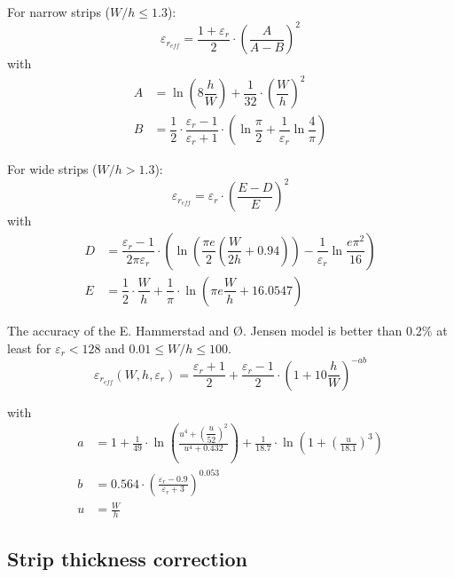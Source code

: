 \documentclass[10pt]{report}
\begin{document}
For narrow strips ($W/h \le 1.3$):
\begin{equation}
\varepsilon_{r_{eff}} = \dfrac{1 + \varepsilon_r}{2}\cdot \left(\dfrac{A}{A - B}\right)^2
\end{equation}
with
\begin{align}
A &= \ln{\left(8\dfrac{h}{W}\right)} + \dfrac{1}{32}\cdot\left(\dfrac{W}{h}\right)^2\\
B &= \dfrac{1}{2}\cdot \dfrac{\varepsilon_r - 1}{\varepsilon_r + 1} \cdot\left(\ln{\dfrac{\pi}{2}} + \dfrac{1}{\varepsilon_r}\ln{\dfrac{4}{\pi}}\right)
\end{align}

For wide strips ($W/h > 1.3$):
\begin{equation}
\varepsilon_{r_{eff}} = \varepsilon_r\cdot\left(\dfrac{E - D}{E}\right)^2
\end{equation}
with
\begin{align}
D &= \dfrac{\varepsilon_r - 1}{2\pi \varepsilon_r}\cdot\left(\ln{\left(\dfrac{\pi e}{2}\left(\dfrac{W}{2h} + 0.94\right)\right)} - \dfrac{1}{\varepsilon_r} \ln{\dfrac{e\pi^{2}}{16}}\right)\\
E &= \dfrac{1}{2}\cdot\dfrac{W}{h} + \dfrac{1}{\pi}\cdot \ln{\left(\pi e \dfrac{W}{h} + 16.0547\right)}
\end{align}

The accuracy of the E. Hammerstad and {\O}. Jensen \cite{Hammerstad} model
is better than 0.2\% at least for $\varepsilon_r < 128$ and $0.01 \le
W/h \le 100$.
\begin{equation}
\label{eq:HandJErEff}
\varepsilon_{r_{eff}}\left(W, h, \varepsilon_r\right) = \frac{\varepsilon_{r} + 1}{2} + \frac{\varepsilon_{r} - 1}{2}\cdot\left(1 + 10\frac{h}{W}\right)^{-ab}
\end{equation}

with
\begin{align}
a &= 1 + \frac{1}{49}\cdot\ln{\left(\frac{u^{4} + \left(\dfrac{u}{52}\right)^{2}}{u^{4} + 0.432}\right)} + \frac{1}{18.7}\cdot\ln{\left(1 + \left(\frac{u}{18.1}\right)^{3}\right)}\\
b &= 0.564\cdot\left(\frac{\varepsilon_{r} - 0.9}{\varepsilon_{r} + 3}\right)^{0.053}\\
u &= \frac{W}{h}
\end{align}

\subsection{Strip thickness correction}
\end{document}

